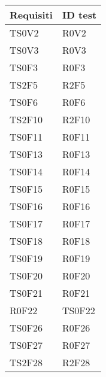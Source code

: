 \documentclass[../PianoDiQualifica.tex]{subfiles}
\begin{document}
	\begin{longtable}[c] { >{\centering\arraybackslash}p{3cm} >{\centering\arraybackslash}p{3cm}}
		\toprule
		\centerline{\textbf{Requisiti}} & \centerline{\textbf{ID test}} \\
			\midrule
			TS0V2 & R0V2 \\
			\addlinespace[0.3em]
			\midrule
			\addlinespace[0.3em]
			TS0V3 & R0V3 \\
			\addlinespace[0.3em]
			\midrule
			\addlinespace[0.3em]
			TS0F3 & R0F3 \\
			\addlinespace[0.3em]
			\midrule
			\addlinespace[0.3em]
			TS2F5 & R2F5 \\ 
			\addlinespace[0.3em]
			\midrule
			\addlinespace[0.3em]
			TS0F6 & R0F6 \\ 
			\addlinespace[0.3em]
			\midrule
			\addlinespace[0.3em]
			TS2F10 & R2F10 \\ 
			\addlinespace[0.3em]
			\midrule
			\addlinespace[0.3em]
			TS0F11 & R0F11 \\ 
			\addlinespace[0.3em]
			\midrule
			\addlinespace[0.3em]
			TS0F13 & R0F13 \\ 
			\addlinespace[0.3em]
			\midrule
			\addlinespace[0.3em]
			TS0F14 & R0F14 \\ 
			\addlinespace[0.3em]
			\midrule
			\addlinespace[0.3em]
			TS0F15 & R0F15 \\ 
			\addlinespace[0.3em]
			\midrule
			\addlinespace[0.3em]
			TS0F16 & R0F16 \\
			\addlinespace[0.3em]
			\midrule
			\addlinespace[0.3em] 
			TS0F17 & R0F17 \\ 
			\addlinespace[0.3em]
			\midrule
			\addlinespace[0.3em]
			TS0F18 & R0F18 \\ 
			\addlinespace[0.3em]
			\midrule
			\addlinespace[0.3em]
			TS0F19 & R0F19 \\ 
			\addlinespace[0.3em]
			\midrule
			\addlinespace[0.3em]
			TS0F20 & R0F20 \\ 
			\addlinespace[0.3em]
			\midrule
			\addlinespace[0.3em]
			TS0F21 & R0F21 \\ 
			\addlinespace[0.3em]
			\midrule
			\addlinespace[0.3em]
			R0F22 & TS0F22 \\ 
			\addlinespace[0.3em]
			\midrule
			\addlinespace[0.3em]
			TS0F26 & R0F26 \\ 
			\addlinespace[0.3em]
			\midrule
			\addlinespace[0.3em]
			TS0F27 & R0F27 \\ 
			\addlinespace[0.3em]
			\midrule
			\addlinespace[0.3em]
			TS2F28 & R2F28 \\ 

\end{longtable}
\end{document}
